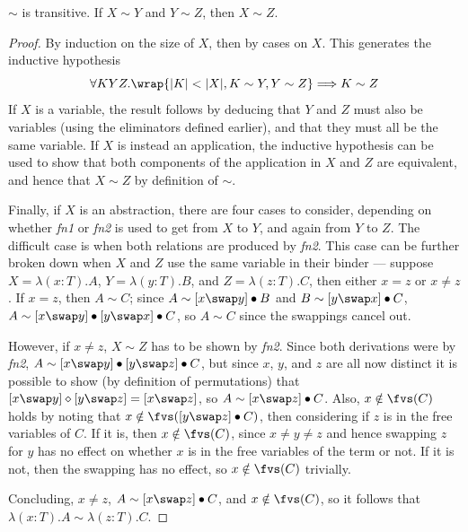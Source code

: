 \begin{lemma}
\(\sim\) is transitive.
If \(X \sim Y\) and \(Y \sim Z\), then \(X \sim Z\).
\end{lemma}
\begin{proof}
By induction on the size of \(X\), then by cases on \(X\).
This generates the inductive hypothesis
\[
\forall K Y Z. \wrap{|K| < |X|, K \sim Y, Y \sim Z} \Longrightarrow K \sim Z
\]
If \(X\) is a variable, the result follows by deducing that \(Y\) and \(Z\) must also be variables (using the eliminators defined earlier), and that they must all be the same variable.
If \(X\) is instead an application, the inductive hypothesis can be used to show that both components of the application in \(X\) and \(Z\) are equivalent, and hence that \(X \sim Z\) by definition of \(\sim\).

Finally, if \(X\) is an abstraction, there are four cases to consider, depending on whether \emph{fn1} or \emph{fn2} is used to get from \(X\) to \(Y\), and again from \(Y\) to \(Z\).
The difficult case is when both relations are produced by \emph{fn2}.
This case can be further broken down when \(X\) and \(Z\) use the same variable in their binder --- suppose \(X = \lambda (x:T).A\), \(Y = \lambda (y:T).B\), and \(Z = \lambda (z:T). C\), then either \(x = z\) or \(x \neq z\).
If \(x = z\), then \(A \sim C\); since \(A \sim [x \swap y] \bullet B\) and \(B \sim [y \swap x] \bullet C\), \(A \sim [x \swap y] \bullet [y \swap x] \bullet C\), so \(A \sim C\) since the swappings cancel out.

However, if \(x \neq z\), \(X \sim Z\) has to be shown by \emph{fn2}.
Since both derivations were by \emph{fn2}, \(A \sim [x \swap y] \bullet [y \swap z] \bullet C\), but since \(x\), \(y\), and \(z\) are all now distinct it is possible to show (by definition of permutations) that \([x \swap y] \diamond [y \swap z] = [x \swap z]\), so \(A \sim [x \swap z] \bullet C\).
Also, \(x \notin \fvs(C)\) holds by noting that \(x \notin \fvs([y \swap z] \bullet C)\), then considering if \(z\) is in the free variables of \(C\).
If it is, then \(x \notin \fvs(C)\), since \(x \neq y \neq z\) and hence swapping \(z\) for \(y\) has no effect on whether \(x\) is in the free variables of the term or not.
If it is not, then the swapping has no effect, so \(x \notin \fvs(C)\) trivially.

Concluding, \(x \neq z\), \(A \sim [x \swap z] \bullet C\), and \(x \notin \fvs(C)\), so it follows that \(\lambda (x:T).A \sim \lambda (z:T).C\).
\end{proof}

